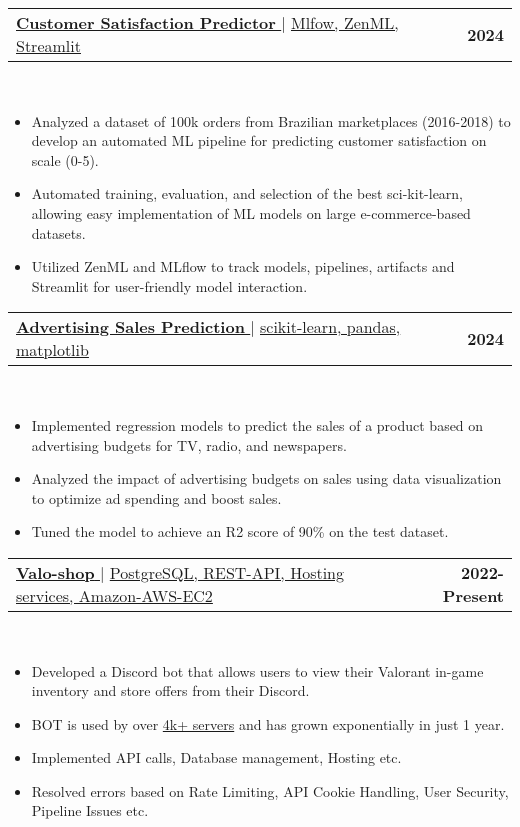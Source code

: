\documentclass[letterpaper,11pt]{article}
\makeatletter
\newcommand{\resumeItem}[1]{
  \item\small{
    {#1 \vspace{-2pt}}
  }
}
\newcommand{\resumeProjectHeading}[2]{
    \item
    \begin{tabular*}{1.001\textwidth}{l@{\extracolsep{\fill}}r}
      \small#1 & \textbf{\small #2}\\
    \end{tabular*}\vspace{-7pt}
}
\newcommand{\resumeItemListStart}{\begin{itemize}}
\newcommand{\resumeItemListEnd}{\end{itemize}\vspace{-5pt}}
\makeatother
\begin{document}
      \resumeProjectHeading
      {\href{https://github.com/typhonshambo/customer-satisfaction-predictor}{\textbf{\large{\underline{\textbf{Customer Satisfaction Predictor}}}} \href{Project Link}{\raisebox{-0.1\height}\faExternalLink }} $|$ \large{\underline{Mlfow, ZenML, Streamlit}}}{2024}\\
      \resumeItemListStart
        \resumeItem{\normalsize{Analyzed a dataset of 100k orders from Brazilian marketplaces (2016-2018) to develop an automated ML pipeline for predicting customer satisfaction on scale (0-5).}}
        \resumeItem{\normalsize{Automated training, evaluation, and selection of the best sci-kit-learn, allowing easy implementation of ML models on large e-commerce-based datasets.}} 
        \resumeItem{\normalsize{Utilized ZenML and MLflow to track models, pipelines, artifacts and Streamlit for user-friendly model interaction.}}
      \resumeItemListEnd 
      \vspace{-13pt}
      
      
  \resumeProjectHeading
      {\href{https://github.com/typhonshambo/Advertising-Sales-Prediction}{\textbf{\large{\underline{\textbf{Advertising Sales Prediction}}}} \href{Project Link}{\raisebox{-0.1\height}\faExternalLink }} $|$ \large{\underline{scikit-learn, pandas, matplotlib}}}{2024}\\
      \resumeItemListStart
        \resumeItem{\normalsize{Implemented regression models to predict the sales of a product based on advertising budgets for TV, radio, and newspapers.}}
        \resumeItem{\normalsize{Analyzed the impact of advertising budgets on sales using data visualization to optimize ad spending and boost sales.}}
        \resumeItem{\normalsize{Tuned the model to achieve an R2 score of 90\% on the test dataset.}}
      \resumeItemListEnd
      \vspace{-13pt}
      \resumeProjectHeading
          {\href{https://github.com/typhonshambo/valo-shop}{\textbf{\large{\underline{\textbf{Valo-shop}}}} \href{Project Link}{\raisebox{-0.1\height}\faExternalLink }} $|$ \large{\underline{PostgreSQL, REST-API, Hosting services,  Amazon-AWS-EC2}}}{2022-Present}\\
          \resumeItemListStart
            \resumeItem{\normalsize{Developed a Discord bot that allows users to view their Valorant in-game inventory and store offers from their Discord.}}
            \resumeItem{\normalsize{BOT is used by over \underline{4k+ servers} and has grown exponentially in just 1 year.}}
            \resumeItem{\normalsize{Implemented API calls, Database management, Hosting etc.}}
            \resumeItem{\normalsize{Resolved errors based on Rate Limiting, API Cookie Handling, User Security, Pipeline Issues etc.}}
          \resumeItemListEnd 
          \vspace{-13pt}
\end{document}
